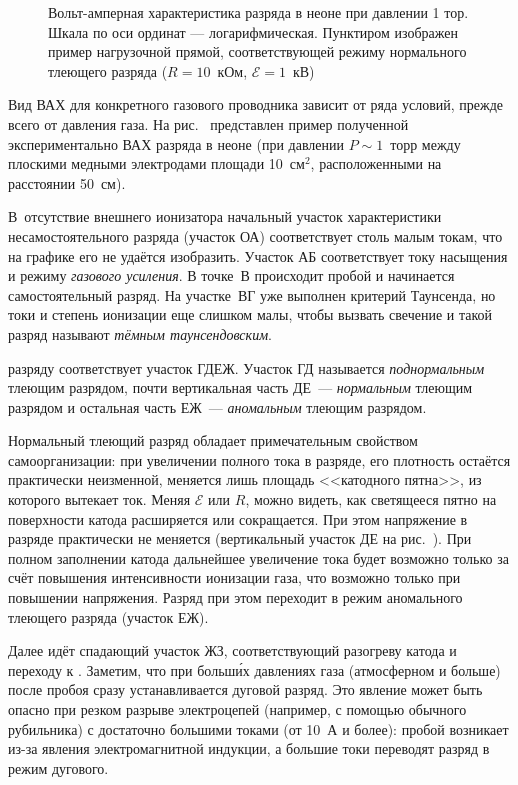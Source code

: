 \begin{labsupplement}
\begin{figure}[h!]
    \centering
    \caption{Вольт-амперная характеристика разряда в неоне при давлении 1 тор. 
        Шкала по оси ординат --- логарифмическая.
        Пунктиром изображен пример нагрузочной прямой,
        соответствующей режиму нормального тлеющего разряда
        ($R=10$~кОм, $\mathcal{E}=1$~кВ)}
\end{figure}

Вид ВАХ для конкретного газового проводника зависит от ряда условий, прежде
всего от давления газа. На рис.~ представлен пример
полученной экспериментально ВАХ разряда в неоне (при давлении $P\sim 1$~торр
между плоскими медными электродами площади 10~см$^2$, расположенными на
расстоянии 50~см).

В~отсутствие внешнего ионизатора начальный участок
характеристики несамостоятельного разряда (участок ОА) соответствует столь
малым токам, что на графике его не удаётся изобразить. Участок 
АБ соответствует току насыщения и режиму \emph{газового усиления}. 
В точке~В происходит пробой и начинается самостоятельный
разряд. На участке~ВГ уже выполнен критерий Таунсенда, но 
токи и степень ионизации еще слишком малы, чтобы вызвать свечение 
и такой разряд называют \emph{тёмным таунсендовским}.

 разряду соответствует участок ГДЕЖ.
Участок ГД называется \emph{поднормальным} тлеющим разрядом,
почти вертикальная часть ДЕ~--- \emph{нормальным} тлеющим разрядом и
остальная часть ЕЖ~--- \emph{аномальным} тлеющим разрядом.

Нормальный тлеющий разряд обладает примечательным свойством самоорганизации:
при увеличении полного тока в разряде, его плотность остаётся практически
неизменной, меняется лишь площадь <<катодного пятна>>, из которого вытекает ток.
Меняя $\mathcal{E}$ или $R$, можно видеть, как светящееся пятно
на поверхности катода расширяется или сокращается.
При этом напряжение в разряде практически не меняется
(вертикальный участок ДЕ на рис.~).
При полном заполнении катода дальнейшее увеличение тока будет возможно только за
счёт повышения интенсивности ионизации газа, что возможно только при повышении
напряжения. Разряд при этом переходит в режим аномального тлеющего разряда
(участок ЕЖ).

Далее идёт спадающий участок ЖЗ, соответствующий разогреву катода и 
переходу к . Заметим, что при больш\'{и}х давлениях газа
(атмосферном и больше) после пробоя сразу устанавливается дуговой разряд.
Это явление может быть опасно при резком разрыве электроцепей (например, с помощью
обычного рубильника) с достаточно большими токами (от 10~А и более): пробой
возникает из-за явления электромагнитной индукции, а большие токи 
переводят разряд в режим дугового.


\end{labsupplement}
